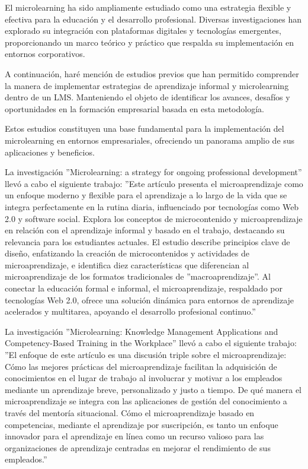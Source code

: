 
El microlearning ha sido ampliamente estudiado como una estrategia flexible y
efectiva para la educación y el desarrollo profesional. Diversas investigaciones
han explorado su integración con plataformas digitales y tecnologías emergentes,
proporcionando un marco teórico y práctico que respalda su implementación en
entornos corporativos.

A continuación, haré mención de estudios previos que han permitido comprender la
manera de implementar estrategias de aprendizaje informal y microlearning dentro
de un LMS. Manteniendo el objeto de identificar los avances, desafíos y
oportunidades en la formación empresarial basada en esta metodología.

Estos estudios constituyen una base fundamental para la implementación del
microlearning en entornos empresariales, ofreciendo un panorama amplio de sus
aplicaciones y beneficios.

La investigación ''Microlearning: a strategy for ongoing professional
development'' llevó a cabo el siguiente trabajo: ''Este artículo presenta el
microaprendizaje como un enfoque moderno y flexible para el aprendizaje a lo
largo de la vida que se integra perfectamente en la rutina diaria, influenciado
por tecnologías como Web 2.0 y software social. Explora los conceptos de
microcontenido y microaprendizaje en relación con el aprendizaje informal y
basado en el trabajo, destacando su relevancia para los estudiantes actuales. El
estudio describe principios clave de diseño, enfatizando la creación de
microcontenidos y actividades de microaprendizaje, e identifica diez
características que diferencian al microaprendizaje de los formatos
tradicionales de ''macroaprendizaje''. Al conectar la educación formal e informal,
el microaprendizaje, respaldado por tecnologías Web 2.0, ofrece una solución
dinámica para entornos de aprendizaje acelerados y multitarea, apoyando el
desarrollo profesional continuo.''
\cite{article:microlearning_buchem}

La investigación ''Microlearning: Knowledge Management Applications and
Competency-Based Training in the Workplace'' llevó a cabo el siguiente trabajo:
''El enfoque de este artículo es una discusión triple sobre el microaprendizaje:
Cómo las mejores prácticas del microaprendizaje facilitan la adquisición de
conocimientos en el lugar de trabajo al involucrar y motivar a los empleados
mediante un aprendizaje breve, personalizado y justo a tiempo.
De qué manera el microaprendizaje se integra con las aplicaciones de gestión del
conocimiento a través del mentoría situacional.
Cómo el microaprendizaje basado en competencias, mediante el aprendizaje por
suscripción, es tanto un enfoque innovador para el aprendizaje en línea como un
recurso valioso para las organizaciones de aprendizaje centradas en mejorar el
rendimiento de sus empleados.''
\cite{article:microlearning_emerson}

